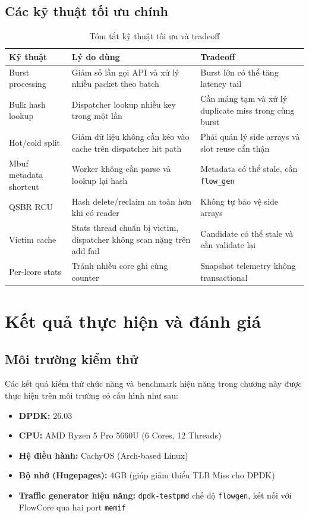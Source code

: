 \documentclass[12pt,a4paper]{report}
\DeclareRobustCommand{\code}[1]{{\small\texttt{#1}}}
\begin{document}
\section{Các kỹ thuật tối ưu chính}

\begin{table}[H]
\centering
\small
\caption{Tóm tắt kỹ thuật tối ưu và tradeoff}
\label{tab:optimization_summary}
\begin{tabularx}{\textwidth}{|L{4.5cm}|Y|Y|}
\hline
\textbf{Kỹ thuật} & \textbf{Lý do dùng} & \textbf{Tradeoff} \\
\hline
Burst processing & Giảm số lần gọi API và xử lý nhiều packet theo batch & Burst lớn có thể tăng latency tail \\
\hline
Bulk hash lookup & Dispatcher lookup nhiều key trong một lần & Cần mảng tạm và xử lý duplicate miss trong cùng burst \\
\hline
Hot/cold split & Giảm dữ liệu không cần kéo vào cache trên dispatcher hit path & Phải quản lý side arrays và slot reuse cẩn thận \\
\hline
Mbuf metadata shortcut & Worker không cần parse và lookup lại hash & Metadata có thể stale, cần \code{flow\_gen} \\
\hline
QSBR RCU & Hash delete/reclaim an toàn hơn khi có reader & Không tự bảo vệ side arrays \\
\hline
Victim cache & Stats thread chuẩn bị victim, dispatcher không scan nặng trên add fail & Candidate có thể stale và cần validate lại \\
\hline
Per-lcore stats & Tránh nhiều core ghi cùng counter & Snapshot telemetry không transactional \\
\hline
\end{tabularx}
\end{table}

\chapter{Kết quả thực hiện và đánh giá}

\section{Môi trường kiểm thử}

Các kết quả kiểm thử chức năng và benchmark hiệu năng trong chương này được thực hiện trên môi trường có cấu hình như sau:

\begin{itemize}
    \item \textbf{DPDK:} 26.03
    \item \textbf{CPU:} AMD Ryzen 5 Pro 5660U (6 Cores, 12 Threads)
    \item \textbf{Hệ điều hành:} CachyOS (Arch-based Linux)
    \item \textbf{Bộ nhớ (Hugepages):} 4GB (giúp giảm thiểu TLB Miss cho DPDK)
    \item \textbf{Traffic generator hiệu năng:} \code{dpdk-testpmd} chế độ \code{flowgen}, kết nối với FlowCore qua hai port \code{memif}
\end{itemize}
\end{document}
